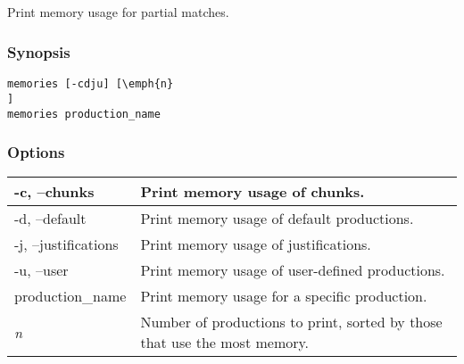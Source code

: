 \subsection{}
\label{memories}
Print memory usage for partial matches. 
\subsubsection*{Synopsis}
\begin{verbatim}
memories [-cdju] [\emph{n}
]
memories production_name
\end{verbatim}
\subsubsection*{Options}
\begin{tabular}{|l|l|}
\hline 
 -c, --chunks  & Print memory usage of chunks.  \\
 \hline 
 -d, --default  & Print memory usage of default productions.  \\
 \hline 
 -j, --justifications  & Print memory usage of justifications.  \\
 \hline 
 -u, --user  & Print memory usage of user-defined productions.  \\
 \hline 
production\_name & Print memory usage for a specific production.  \\
 \hline 
\emph{n}
 & Number of productions to print, sorted by those that use the most memory.  \\
 \hline 
\end{tabular}
